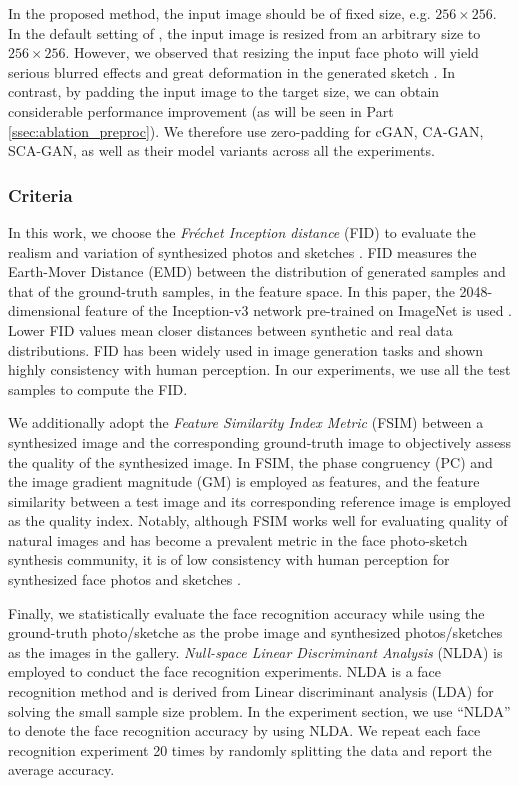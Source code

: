\documentclass[journal]{IEEEtran}
\begin{document}
In the proposed method, the input image should be of fixed size, e.g. $256 \times 256$. In the default setting of \cite{Isola2017Pix2Pix}, the input image is resized from an arbitrary size to $256 \times 256$. However, we observed that resizing the input face photo will yield serious blurred effects and great deformation in the generated sketch \cite{wang2017bpgan} \cite{wang2017multgan}. In contrast, by padding the input image to the target size, we can obtain considerable performance improvement (as will be seen in Part \ref{ssec:ablation_preproc}). 
We therefore use zero-padding for cGAN, CA-GAN, SCA-GAN, as well as their model variants across all the experiments.


\subsubsection{Criteria}
\label{sec:criteria}
In this work, we choose the \textit{Fr\'{e}chet Inception distance} (FID) to evaluate the realism and variation of synthesized photos and sketches \cite{Heusel2017FID,Lucic2017Are}. 
FID measures the Earth-Mover Distance (EMD) between the distribution of generated samples and that of the ground-truth samples, in the feature space. In this paper, the 2048-dimensional feature of the Inception-v3 network pre-trained on ImageNet is used \cite{szegedy2016rethinking}.
Lower FID values mean closer distances between synthetic and real data distributions. FID has been widely used in image generation tasks and shown highly consistency with human perception. In our experiments, we use all the test samples to compute the FID. 

We additionally adopt the \textit{Feature Similarity Index Metric} (FSIM) \cite{Zhang2011FSIM} between a synthesized image and the corresponding ground-truth image to objectively assess the quality of the synthesized image. 
In FSIM, the phase congruency (PC) and the image gradient magnitude (GM) is employed as features, and the feature similarity between a test image and its corresponding reference image is employed as the quality index. 
Notably, although FSIM works well for evaluating quality of natural images and has become a prevalent metric in the face photo-sketch synthesis community, it is of low consistency with human perception for synthesized face photos and sketches \cite{Wang2016Evaluation}. 

Finally, we statistically evaluate the face recognition accuracy while using the ground-truth photo/sketche as the probe image and synthesized photos/sketches as the images in the gallery. 
\textit{Null-space Linear Discriminant Analysis} (NLDA) \cite{Ref28} is employed to conduct the face recognition experiments. 
NLDA is a face recognition method and is derived from Linear discriminant analysis (LDA) for solving the small sample size problem. In the experiment section, we use “NLDA” to denote the face recognition accuracy by using NLDA.
We repeat each face recognition experiment 20 times by randomly splitting the data and report the average accuracy.
\end{document}

